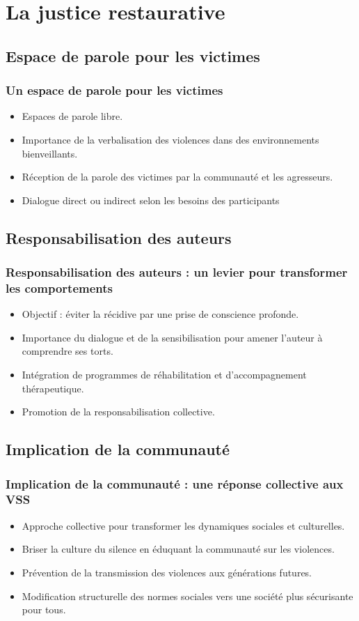 \documentclass[french]{beamer}
\begin{document}
\section{La justice restaurative}
\subsection{Espace de parole pour les victimes}
\begin{frame}
  \frametitle{Un espace de parole pour les victimes}
  \begin{itemize}
    \item Espaces de parole libre.
    \item Importance de la verbalisation des violences dans des environnements bienveillants.
    \item Réception de la parole des victimes par la communauté et les agresseurs.
    \item Dialogue direct ou indirect selon les besoins des participants 
  
  \end{itemize}
\end{frame}

\subsection{Responsabilisation des auteurs}
\begin{frame}
  \frametitle{Responsabilisation des auteurs : un levier pour transformer les comportements}
  \begin{itemize}
    \item Objectif : éviter la récidive par une prise de conscience profonde.
    \item Importance du dialogue et de la sensibilisation pour amener l'auteur à comprendre ses torts.
    \item Intégration de programmes de réhabilitation et d'accompagnement thérapeutique.
    \item Promotion de la responsabilisation collective.
  \end{itemize}
\end{frame}

\subsection{Implication de la communauté}
\begin{frame}
  \frametitle{Implication de la communauté : une réponse collective aux VSS}
  \begin{itemize}
    \item Approche collective pour transformer les dynamiques sociales et culturelles.
    \item Briser la culture du silence en éduquant la communauté sur les violences.
    \item Prévention de la transmission des violences aux générations futures.
    \item Modification structurelle des normes sociales vers une société plus sécurisante pour tous.
  \end{itemize}
\end{frame}
\end{document}

